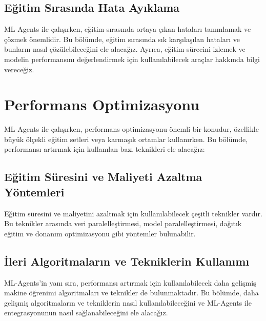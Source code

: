 \documentclass{article}
\begin{document}
    \subsection{Eğitim Sırasında Hata Ayıklama}
        ML-Agents ile çalışırken, eğitim sırasında ortaya çıkan hataları tanımlamak ve çözmek önemlidir. Bu bölümde, eğitim sırasında sık karşılaşılan hataları ve bunların nasıl çözülebileceğini ele alacağız. Ayrıca, eğitim sürecini izlemek ve modelin performansını değerlendirmek için kullanılabilecek araçlar hakkında bilgi vereceğiz.


\section{Performans Optimizasyonu}
    ML-Agents ile çalışırken, performans optimizasyonu önemli bir konudur, özellikle büyük ölçekli eğitim setleri veya karmaşık ortamlar kullanırken. Bu bölümde, performansı artırmak için kullanılan bazı teknikleri ele alacağız:

    \subsection{Eğitim Süresini ve Maliyeti Azaltma Yöntemleri}
        Eğitim süresini ve maliyetini azaltmak için kullanılabilecek çeşitli teknikler vardır. Bu teknikler arasında veri paralelleştirmesi, model paralelleştirmesi, dağıtık eğitim ve donanım optimizasyonu gibi yöntemler bulunabilir.

    \subsection{İleri Algoritmaların ve Tekniklerin Kullanımı}
        ML-Agents'in yanı sıra, performansı artırmak için kullanılabilecek daha gelişmiş makine öğrenimi algoritmaları ve teknikler de bulunmaktadır. Bu bölümde, daha gelişmiş algoritmaların ve tekniklerin nasıl kullanılabileceğini ve ML-Agents ile entegrasyonunun nasıl sağlanabileceğini ele alacağız.
\clearpage


\end{document}
